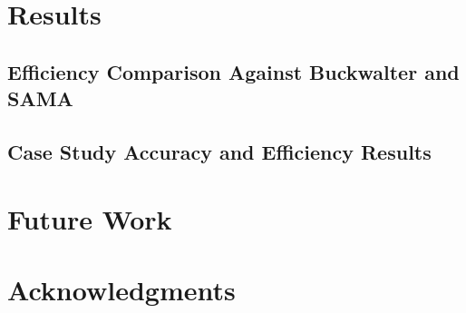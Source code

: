 \documentclass[11pt,letterpaper]{article}
\begin{document}
\section{Results}
\label{sec:results}

\subsection{Efficiency Comparison Against Buckwalter and SAMA}

\subsection{Case Study Accuracy and Efficiency Results}


\section{Future Work}






\section*{Acknowledgments}



\end{document}
